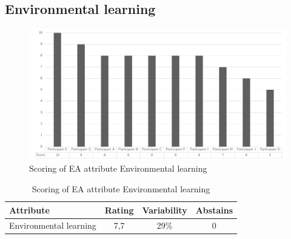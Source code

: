 \subsection{Environmental learning}
\begin{figure}[h!]
	\centering
	\includegraphics[width=0.9\linewidth]{images/scoreeaenvironmentallearning}
	\caption[Scoring of EA attribute Environmental learning]{Scoring of EA attribute Environmental learning}
	\label{fig:appscoringeaenvironmentallearning}
\end{figure}
\begin{table}[h!]
	\centering
	\begin{tabular}{p{}ccc}
		\toprule
		\textbf{Attribute} & \textbf{Rating} & \textbf{Variability} & \textbf{Abstains} \\
		\midrule
		Environmental learning & 7,7 & 29\% & 0 \\%
		\bottomrule
	\end{tabular}%
	\caption[Scoring of EA attribute Environmental learning]{Scoring of EA attribute Environmental learning}
	\label{tab:appscoringeaenvironmentallearning}%
\end{table}%
\newpage
